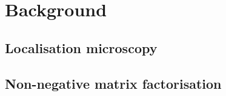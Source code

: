 \chapter{Background}

\section{Localisation microscopy}


\section{Non-negative matrix factorisation}


